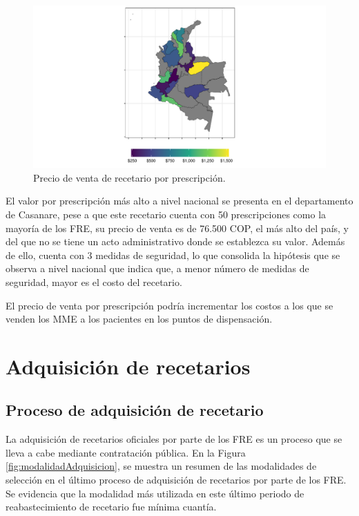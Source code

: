 \documentclass[
]{book}
\begin{document}
\begin{figure}

{\centering \includegraphics[width=0.9\linewidth]{InformeFinal_files/figure-latex/PVTA-Recetarios-1} 

}

\caption{Precio de venta de recetario por prescripción.}\label{fig:PVTA-Recetarios}
\end{figure}

El valor por prescripción más alto a nivel nacional se presenta en el departamento de Casanare, pese a que este recetario cuenta con 50 prescripciones como la mayoría de los FRE, su precio de venta es de 76.500 COP, el más alto del país, y del que no se tiene un acto administrativo donde se establezca su valor. Además de ello, cuenta con 3 medidas de seguridad, lo que consolida la hipótesis que se observa a nivel nacional que indica que, a menor número de medidas de seguridad, mayor es el costo del recetario.

El precio de venta por prescripción podría incrementar los costos a los que se venden los MME a los pacientes en los puntos de dispensación.

\hypertarget{adquisiciuxf3n-de-recetarios}{%
\section{Adquisición de recetarios}\label{adquisiciuxf3n-de-recetarios}}


\hypertarget{proceso-de-adquisiciuxf3n-de-recetario}{%
\subsection{Proceso de adquisición de recetario}\label{proceso-de-adquisiciuxf3n-de-recetario}}

La adquisición de recetarios oficiales por parte de los FRE es un proceso que se lleva a cabe mediante contratación pública. En la Figura \ref{fig:modalidadAdquisicion}, se muestra un resumen de las modalidades de selección en el último proceso de adquisición de recetarios por parte de los FRE. Se evidencia que la modalidad más utilizada en este último periodo de reabastecimiento de recetario fue mínima cuantía.
\end{document}
